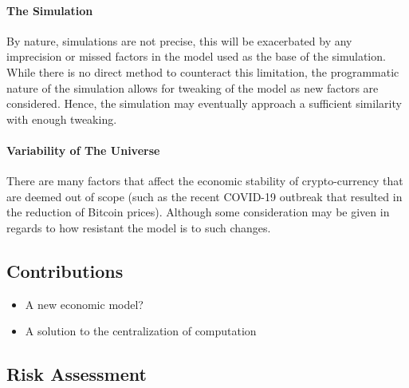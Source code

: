 \paragraph{The Simulation} By nature, simulations are not precise, this will be exacerbated by any imprecision or missed factors in the model used as the base of the simulation. While there is no direct method to counteract this limitation, the programmatic nature of the simulation allows for tweaking of the model as new factors are considered. Hence, the simulation may eventually approach a sufficient similarity with enough tweaking.

\paragraph{Variability of The Universe}  There are many factors that affect the economic stability of crypto-currency that are deemed out of scope (such as the recent  COVID-19 outbreak that resulted in the reduction of Bitcoin prices). Although some consideration may be given in regards to how resistant the model is to such changes.

\subsection{Contributions}

\begin{itemize}
  \item A new economic model?
  \item A solution to the centralization of computation
\end{itemize}

\subsection{Risk Assessment}

